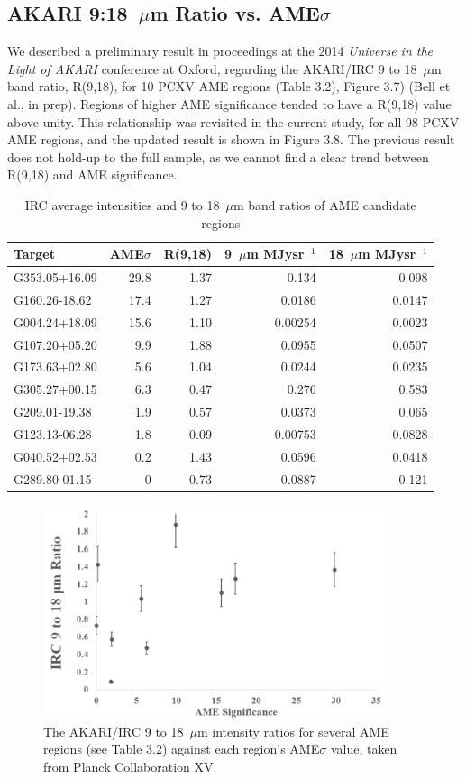 \subsection{AKARI 9:18~$\mu$m Ratio vs. AME$\sigma$}
     We described a preliminary result in proceedings at the 2014 \textit{Universe in the Light of AKARI} conference at Oxford, regarding the AKARI/IRC 9 to 18~$\mu$m band ratio, R(9,18), for 10 PCXV AME regions (Table 3.2), Figure 3.7) (Bell et al., in prep). Regions of higher AME significance tended to have a R(9,18) value above unity. This relationship was revisited in the current study, for all 98 PCXV AME regions, and the updated result is shown in Figure 3.8. The previous result does not hold-up to the full sample, as we cannot find a clear trend between R(9,18) and AME significance.
\begin{table}[!htb]
\label{tab:R918a}
\caption{IRC average intensities and 9 to 18~$\mu$m band ratios of AME candidate regions}
\centering
\begin{tabular}{lrrrr}
\toprule
Target           & AME$\sigma$       & R(9,18)          &  9~$\mu$m MJysr$^{-1}$        & 18~$\mu$m MJysr$^{-1}$ \\
\midrule
G353.05+16.09   & 29.8	     & 1.37   &  0.134       & 0.098 \\
G160.26-18.62	 & 17.4	     & 1.27   &  0.0186      & 0.0147 \\
G004.24+18.09   & 15.6      & 1.10   &  0.00254     & 0.0023 \\
G107.20+05.20	 & 9.9       & 1.88   &  0.0955      & 0.0507 \\
G173.63+02.80	 & 5.6       & 1.04   &  0.0244      & 0.0235 \\
G305.27+00.15	 & 6.3       & 0.47   &  0.276       & 0.583 \\ 
G209.01-19.38 & 1.9       & 0.57   &  0.0373      & 0.065 \\
G123.13-06.28 & 1.8       & 0.09   &  0.00753     & 0.0828 \\
G040.52+02.53 & 0.2       & 1.43   &  0.0596      & 0.0418 \\
G289.80-01.15 & 0         & 0.73   &  0.0887      & 0.121 \\
\bottomrule
\end{tabular}
\end{table}
\begin{figure}[!htb]
\label{fig:R918PlotA}
\centering
\includegraphics[angle=0,width=100mm]{EPS/bell_fig1.pdf}
\caption{The AKARI/IRC 9 to 18~$\mu$m intensity ratios for several AME regions (see Table 3.2) against each region's AME$\sigma$ value, taken from Planck Collaboration XV.}
\end{figure}
